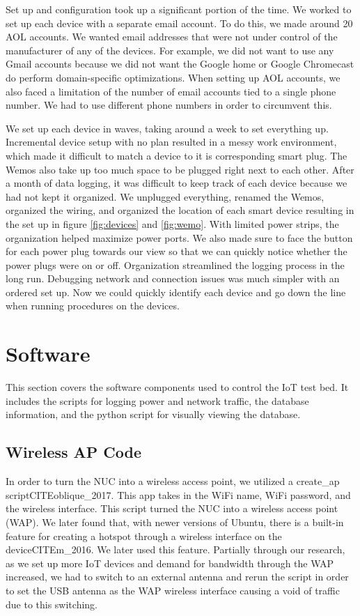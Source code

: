 Set up and configuration took up a significant portion of the time. We worked to set up each device with a separate email account. To do this, we made around 20 AOL accounts. We wanted email addresses that were not under control of the manufacturer of any of the devices. For example, we did not want to use any Gmail accounts because we did not want the Google home or Google Chromecast do perform domain-specific optimizations. When setting up AOL accounts, we also faced a limitation of the number of email accounts tied to a single phone number. We had to use different phone numbers in order to circumvent this.

We set up each device in waves, taking around a week to set everything up. Incremental device setup with no plan resulted in a messy work environment, which made it difficult to match a device to it is corresponding smart plug. The Wemos also take up too much space to be plugged right next to each other. After a month of data logging, it was difficult to keep track of each device because we had not kept it organized. We unplugged everything, renamed the Wemos, organized the wiring, and organized the location of each smart device resulting in the set up in figure \ref{fig:devices} and \ref{fig:wemo}. With limited power strips, the organization helped maximize power ports. We also made sure to face the button for each power plug towards our view so that we can quickly notice whether the power plugs were on or off. Organization streamlined the logging process in the long run. Debugging network and connection issues was much simpler with an ordered set up. Now we could quickly identify each device and go down the line when running procedures on the devices.

\section{Software}
\label{software}
This section covers the software components used to control the IoT test bed. It includes the scripts for logging power and network traffic, the database information, and the python script for visually viewing the database.

\subsection{Wireless AP Code}
In order to turn the NUC into a wireless access point, we utilized a create\_ap script\cite{guest_2018}CITEoblique\_2017. This app takes in the WiFi name, WiFi password, and the wireless interface. This script turned the NUC into a wireless access point (WAP). We later found that, with newer versions of Ubuntu, there is a built-in feature for creating a hotspot through a wireless interface on the device\cite{guest_2018}CITEm\_2016. We later used this feature. Partially through our research, as we set up more IoT devices and demand for bandwidth through the WAP increased, we had to switch to an external antenna and rerun the script in order to set the USB antenna as the WAP wireless interface causing a void of traffic due to this switching.

